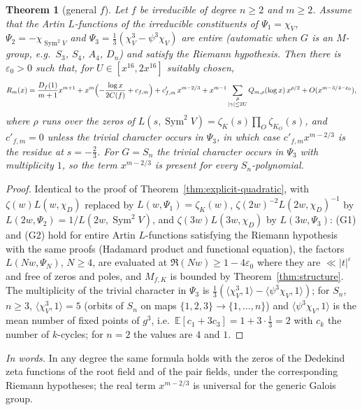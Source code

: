 \documentclass[11pt,a4paper]{article}
\newtheorem{theorem}{Theorem}
\theoremstyle{remark}\newtheorem{remark}[theorem]{Remark}
\newcommand{\Sym}{\operatorname{Sym}}\newcommand{\Res}{\operatorname*{Res}}
\begin{document}
\begin{theorem}[general $f$]\label{thm:explicit-general}
Let $f$ be irreducible of degree $n\ge2$ and $m\ge2$. Assume that the Artin $L$-functions of the irreducible
constituents of $\Psi_1=\chi_V$, $\Psi_2=-\chi_{\Sym^2V}$ and $\Psi_3=\tfrac13(\chi_V^3-\psi^3\chi_V)$ are entire
(automatic when $G$ is an $M$-group, e.g.\ $S_3$, $S_4$, $A_4$, $D_n$) and satisfy the Riemann hypothesis. Then
there is $\varepsilon_0>0$ such that, for $U\in[x^{16},2x^{16}]$ suitably chosen,
\[
R_m(x)=\frac{D_f(1)}{m+1}x^{m+1}+x^m\Bigl(-\frac{\log x}{2C(f)}+c_{f,m}\Bigr)+c'_{f,m}\,x^{m-2/3}
+x^{m-1}\sum_{\substack{\rho\\|\gamma|\le2U}}Q_{m,\rho}(\log x)\,x^{\rho/2}+O(x^{m-3/4-\varepsilon_0}),
\]
where $\rho$ runs over the zeros of $L(s,\Sym^2V)=\zeta_K(s)\prod_O\zeta_{K_O}(s)$, and $c'_{f,m}=0$ unless the
trivial character occurs in $\Psi_3$, in which case $c'_{f,m}x^{m-2/3}$ is the residue at $s=-\tfrac23$. For
$G=S_n$ the trivial character occurs in $\Psi_3$ with multiplicity $1$, so the term $x^{m-2/3}$ is present for
every $S_n$-polynomial.
\end{theorem}
\begin{proof}
Identical to the proof of Theorem~\ref{thm:explicit-quadratic}, with $\zeta(w)L(w,\chi_D)$ replaced by
$L(w,\Psi_1)=\zeta_K(w)$, $\zeta(2w)^{-2}L(2w,\chi_D)^{-1}$ by $L(2w,\Psi_2)=1/L(2w,\Sym^2V)$, and
$\zeta(3w)L(3w,\chi_D)$ by $L(3w,\Psi_3)$: (G1) and (G2) hold for entire Artin $L$-functions satisfying the
Riemann hypothesis with the same proofs (Hadamard product and functional equation), the factors
$L(Nw,\Psi_N)$, $N\ge4$, are evaluated at $\Re(Nw)\ge1-4\varepsilon_0$ where they are $\ll|t|^\varepsilon$ and free of
zeros and poles, and $M_{f,K}$ is bounded by Theorem~\ref{thm:structure}. The multiplicity of the trivial
character in $\Psi_3$ is $\tfrac13(\langle\chi_V^3,1\rangle-\langle\psi^3\chi_V,1\rangle)$; for $S_n$, $n\ge3$,
$\langle\chi_V^3,1\rangle=5$ (orbits of $S_n$ on maps $\{1,2,3\}\to\{1,\dots,n\}$) and $\langle\psi^3\chi_V,1\rangle$ is
the mean number of fixed points of $g^3$, i.e.\ $\mathbb E[c_1+3c_3]=1+3\cdot\tfrac13=2$ with $c_k$ the number of
$k$-cycles; for $n=2$ the values are $4$ and $1$.
\end{proof}

\emph{In words.} In any degree the same formula holds with the zeros of the Dedekind zeta functions of the
root field and of the pair fields, under the corresponding Riemann hypotheses; the real term $x^{m-2/3}$
is universal for the generic Galois group.
\end{document}
